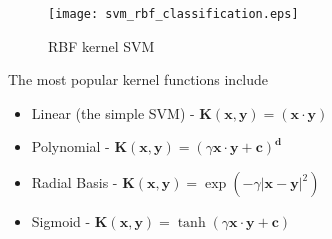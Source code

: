 \begin{figure}
    \centering
    \texttt{[image: svm\_rbf\_classification.eps]}
    \caption{RBF kernel SVM}
    \label{fig:svm_rbf_classify}
\end{figure}

The most popular kernel functions include
\begin{itemize}
    \item{Linear (the simple SVM) - $\mathbf{K(x, y)} = (\mathbf{x} \cdot \mathbf{y})$ }
    \item{Polynomial - $\mathbf{K(x, y)} = (\gamma \mathbf{x} \cdot \mathbf{y} + \mathbf{c})^{\mathbf{d}}$}
    \item{Radial Basis - $\mathbf{K(x, y)} = \exp(-\gamma {| \mathbf{x} - \mathbf{y} |}^{2})$}
    \item{Sigmoid - $\mathbf{K(x, y)} = \tanh(\gamma \mathbf{x} \cdot \mathbf{y} + \mathbf{c})$}
\end{itemize}
